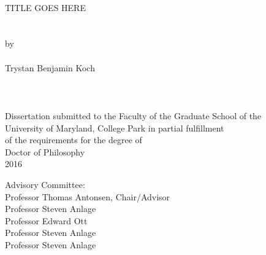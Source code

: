 
\thispagestyle{empty}
\hbox{\ }
\vspace{1in}
\renewcommand{\baselinestretch}{1}
\small\normalsize
\begin{center}

\large{{TITLE GOES HERE}}\\
\ \\
\ \\
\large{by} \\
\ \\
\large{Trystan Benjamin Koch}%
\ \\
\ \\
\ \\
\ \\
\normalsize
Dissertation submitted to the Faculty of the Graduate School of the \\
University of Maryland, College Park in partial fulfillment \\
of the requirements for the degree of \\
Doctor of Philosophy \\
2016
\end{center}

\vspace{7.5em}

\noindent Advisory Committee: \\
Professor Thomas Antonsen, Chair/Advisor \\
Professor Steven Anlage\\
Professor Edward Ott\\
Professor Steven Anlage\\
Professor Steven Anlage\\


